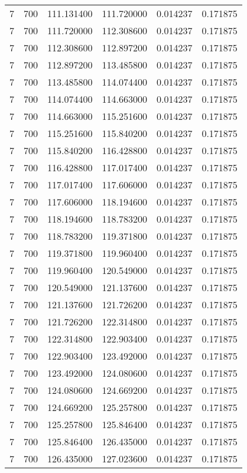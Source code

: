\begin{longtable}{rrrrrr}
7 & 700 & 111.131400 & 111.720000 & 0.014237 & 0.171875 \\
7 & 700 & 111.720000 & 112.308600 & 0.014237 & 0.171875 \\
7 & 700 & 112.308600 & 112.897200 & 0.014237 & 0.171875 \\
7 & 700 & 112.897200 & 113.485800 & 0.014237 & 0.171875 \\
7 & 700 & 113.485800 & 114.074400 & 0.014237 & 0.171875 \\
7 & 700 & 114.074400 & 114.663000 & 0.014237 & 0.171875 \\
7 & 700 & 114.663000 & 115.251600 & 0.014237 & 0.171875 \\
7 & 700 & 115.251600 & 115.840200 & 0.014237 & 0.171875 \\
7 & 700 & 115.840200 & 116.428800 & 0.014237 & 0.171875 \\
7 & 700 & 116.428800 & 117.017400 & 0.014237 & 0.171875 \\
7 & 700 & 117.017400 & 117.606000 & 0.014237 & 0.171875 \\
7 & 700 & 117.606000 & 118.194600 & 0.014237 & 0.171875 \\
7 & 700 & 118.194600 & 118.783200 & 0.014237 & 0.171875 \\
7 & 700 & 118.783200 & 119.371800 & 0.014237 & 0.171875 \\
7 & 700 & 119.371800 & 119.960400 & 0.014237 & 0.171875 \\
7 & 700 & 119.960400 & 120.549000 & 0.014237 & 0.171875 \\
7 & 700 & 120.549000 & 121.137600 & 0.014237 & 0.171875 \\
7 & 700 & 121.137600 & 121.726200 & 0.014237 & 0.171875 \\
7 & 700 & 121.726200 & 122.314800 & 0.014237 & 0.171875 \\
7 & 700 & 122.314800 & 122.903400 & 0.014237 & 0.171875 \\
7 & 700 & 122.903400 & 123.492000 & 0.014237 & 0.171875 \\
7 & 700 & 123.492000 & 124.080600 & 0.014237 & 0.171875 \\
7 & 700 & 124.080600 & 124.669200 & 0.014237 & 0.171875 \\
7 & 700 & 124.669200 & 125.257800 & 0.014237 & 0.171875 \\
7 & 700 & 125.257800 & 125.846400 & 0.014237 & 0.171875 \\
7 & 700 & 125.846400 & 126.435000 & 0.014237 & 0.171875 \\
7 & 700 & 126.435000 & 127.023600 & 0.014237 & 0.171875 \\

\end{longtable}
